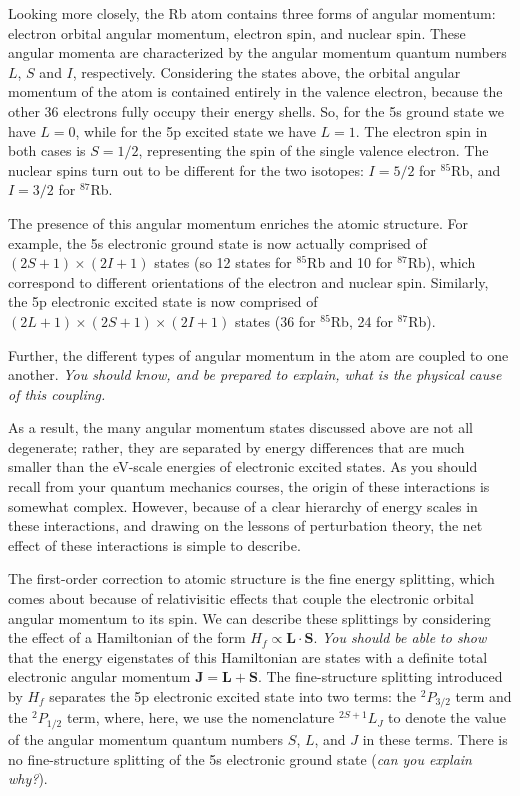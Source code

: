 \documentclass{../lab}
\begin{document}
Looking more closely, the Rb atom contains three forms of angular momentum: electron orbital angular momentum, electron spin, and nuclear spin.  These angular momenta are characterized by the angular momentum quantum numbers $L$, $S$ and $I$, respectively. Considering the states above, the orbital angular momentum of the atom is contained entirely in the valence electron, because the other 36 electrons fully occupy their energy shells.  So, for the 5s ground state we have $L=0$, while for the 5p excited state we have $L=1$.  The electron spin in both cases is $S=1/2$, representing the spin of the single valence electron.  The nuclear spins turn out to be different for the two isotopes: $I=5/2$ for $^{85}$Rb, and $I=3/2$ for $^{87}$Rb.

The presence of this angular momentum enriches the atomic structure.  For example, the 5s electronic ground state is now actually comprised of $(2 S + 1) \times (2 I + 1)$ states (so 12 states for $^{85}$Rb and 10 for $^{87}$Rb), which correspond to different orientations of the electron and nuclear spin.  Similarly, the 5p electronic excited state is now comprised of $(2 L + 1) \times (2 S + 1) \times (2 I + 1)$ states (36 for $^{85}$Rb, 24 for $^{87}$Rb).

Further, the different types of angular momentum in the atom are coupled to one another.  \textit{You should know, and be prepared to explain, what is the physical cause of this coupling.}

As a result, the many angular momentum states discussed above are not all degenerate; rather, they are separated by energy differences that are much smaller than the eV-scale energies of electronic excited states.  As you should recall from your quantum mechanics courses, the origin of these interactions is somewhat complex.  However, because of a clear hierarchy of energy scales in these interactions, and drawing on the lessons of perturbation theory, the net effect of these interactions is simple to describe.

The first-order correction to atomic structure is the fine energy splitting, which comes about because of relativisitic effects that couple the electronic orbital angular momentum to its spin.  We can describe these splittings by considering the effect of a Hamiltonian of the form $H_{f} \propto \mathbf{L}\cdot\mathbf{S}$.  \emph{You should be able to show} that the energy eigenstates of this Hamiltonian are states with a definite total electronic angular momentum $\mathbf{J} = \mathbf{L} + \mathbf{S}$.  The fine-structure splitting introduced by $H_{f}$ separates the 5p electronic excited state into two terms: the $^{2}P_{3/2}$ term and the $^{2}P_{1/2}$ term, where, here, we use the nomenclature $^{2S + 1}L_{J}$ to denote the value of the angular momentum quantum numbers $S$, $L$, and $J$ in these terms.  There is no fine-structure splitting of the 5s electronic ground state (\emph{can you explain why?}).
\end{document}
